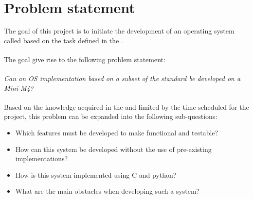 \chapter{Problem statement}
\label{chap:Problem_Statement}

The goal of this project is to initiate the development of an \arinc{}
operating system called \OSname{} based on the task defined in the
.
\\\\
The goal give rise to the following problem statement:
\\\\
\textit{Can an OS implementation based on a subset of the \arinc{} standard be
developed on a Mini-M4?}
\\\\
Based on the knowledge acquired in the 
and limited by the time scheduled for the project, this problem can be expanded
into the following sub-questions:

\begin{itemize}
	\item Which features must be developed to make \OSname{} functional and testable?
	\item How can this system be developed without the use of pre-existing
		implementations?
	\item How is this system implemented using C and python?
	\item What are the main obstacles when developing such a system?
\end{itemize}
